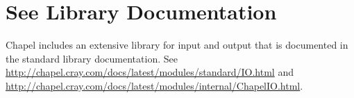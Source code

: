 \label{Input_and_Output}

\section{See Library Documentation}

Chapel includes an extensive library for input and output that is
documented in the standard library documentation. See
\url{http://chapel.cray.com/docs/latest/modules/standard/IO.html}
and
\url{http://chapel.cray.com/docs/latest/modules/internal/ChapelIO.html}.

